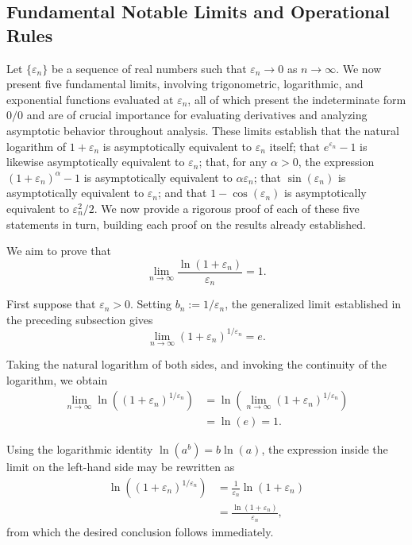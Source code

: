 \subsection{Fundamental Notable Limits and Operational Rules}

\begin{remark}

Let $\{\varepsilon_n\}$ be a sequence of real numbers such that $\varepsilon_n \to 0$ as $n \to \infty$. We now present five fundamental limits, involving trigonometric, logarithmic, and exponential functions evaluated at $\varepsilon_n$, all of which present the indeterminate form $0/0$ and are of crucial importance for evaluating derivatives and analyzing asymptotic behavior throughout analysis. These limits establish that the natural logarithm of $1+\varepsilon_n$ is asymptotically equivalent to $\varepsilon_n$ itself; that $e^{\varepsilon_n}-1$ is likewise asymptotically equivalent to $\varepsilon_n$; that, for any $\alpha > 0$, the expression $(1+\varepsilon_n)^\alpha - 1$ is asymptotically equivalent to $\alpha \varepsilon_n$; that $\sin(\varepsilon_n)$ is asymptotically equivalent to $\varepsilon_n$; and that $1-\cos(\varepsilon_n)$ is asymptotically equivalent to $\varepsilon_n^2/2$. We now provide a rigorous proof of each of these five statements in turn, building each proof on the results already established.


We aim to prove that
\[
\lim_{n \to \infty} \frac{\ln(1+\varepsilon_n)}{\varepsilon_n} = 1.
\]

First suppose that $\varepsilon_n>0$. Setting
$b_n:=1/\varepsilon_n$, the generalized limit established in the preceding
subsection gives
\[
\lim_{n \to \infty} (1+\varepsilon_n)^{1/\varepsilon_n} = e.
\]

Taking the natural logarithm of both sides, and invoking the continuity of the logarithm, we obtain
\[
\begin{aligned}
\lim_{n \to \infty} \ln\!\left( (1+\varepsilon_n)^{1/\varepsilon_n} \right)
&= \ln\!\left( \lim_{n \to \infty} (1+\varepsilon_n)^{1/\varepsilon_n} \right) \\
&= \ln(e) = 1.
\end{aligned}
\]

Using the logarithmic identity $\ln(a^b) = b \ln(a)$, the expression inside the limit on the left-hand side may be rewritten as
\[
\begin{aligned}
\ln\!\left( (1+\varepsilon_n)^{1/\varepsilon_n} \right) &= \frac{1}{\varepsilon_n} \ln(1+\varepsilon_n) \\
&= \frac{\ln(1+\varepsilon_n)}{\varepsilon_n},
\end{aligned}
\]
from which the desired conclusion follows immediately.


\end{remark}

